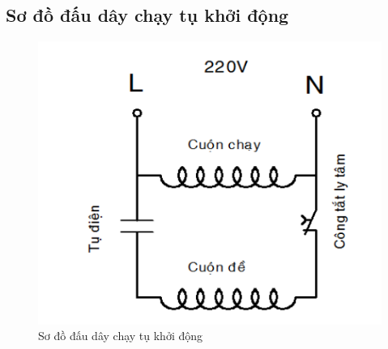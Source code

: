 \documentclass[13pt,a4paper]{extarticle}
\begin{document}
\subsection{Sơ đồ đấu dây chạy tụ khởi động}
\begin{figure}[!h]
\begin{center}
\includegraphics[scale=.45]{chay-de-1}
\end{center}
\caption{Sơ đồ đấu dây chạy tụ khởi động}\label{Fig:chay-de-1}
\end{figure}
\end{document}
